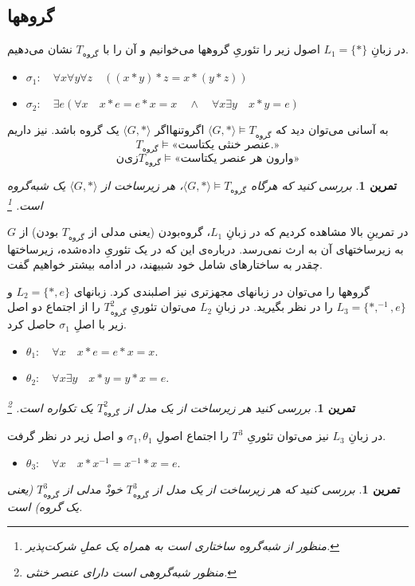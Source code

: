 \documentclass[12pt,a4paper]{report}
\theoremstyle{colorhead}
\newtheorem{tam}[thm]{تمرین}
\begin{document}
\subsection{گروهها }
در زبانِ
$L_1=\{*\}$
اصول زیر را تئوری‌ِ‌ گروهها می‌خوانیم و آن را با
$T_{\text{گروه}}$
نشان می‌دهیم.
\begin{itemize}
\item 
$\sigma_1: \quad \forall x\forall y\forall z \quad \left((x*y)*z=x*(y*z)\right)$
\item $\sigma_2: \quad \exists e \left( \forall x\quad  x*e=e*x=x\quad \wedge\quad  \forall x
 \exists y \quad x*y=e\right)$
\end{itemize}
به آسانی می‌توان دید که
$\langle G,*\rangle \models T_{\text{گروه}}$
اگروتنهااگر
$\langle G,*\rangle$
یک گروه باشد. نیز داریم
\[
T_{\text{گروه}}\models \text{«عنصر خنثی یکتاست.»}
\]
\[
نیز
T_{\text{گروه}}\models \text{«وارون هر عنصر یکتاست»}
\]
\begin{tam}
بررسی کنید که هرگاه
$\langle G,*\rangle \models T_{\text{گروه}}$،
هر زیرساخت از
$\langle G,*\rangle$
یک شبه‌گروه
است.
\footnote{منظور از شبه‌گروه ساختاری است به همراه یک عملِ شرکت‌پذیر.}
\end{tam}
در تمرینِ بالا مشاهده کردیم که در زبانِ
$L_1$،
گروه‌بودن (یعنی مدلی از
$T_{\text{گروه}}$
بودن)
از
$G$
به زیرساختهای آن به ارث نمی‌رسد. درباره‌ی این که در یک تئوریِ داده‌شده،‌ 
زیرساختها چقدر به ساختارهای شامل خود شبیهند، در ادامه بیشتر خواهیم گفت.
\par 
گروهها را می‌توان در زبانهای مجهزتری نیز اصلبندی کرد. زبانهای
$L_2=\{*,e\}$
و
\mbox{$L_3=\{*,^{-1},e\}$}
را در نظر بگیرید. در زبانِ
$L_2$
می‌توان تئوریِ
$T^2_{\text{گروه}}$
را از اجتماع دو اصل زیر با اصلِ
$\sigma_1$
حاصل کرد.
\begin{itemize}
\item 
$\theta_1:\quad \forall x \quad x*e=e*x=x$.
\item 
$\theta_2:\quad \forall x\exists y\quad x*y=y*x=e$.
\end{itemize}
\begin{tam}
بررسی کنید هر زیرساخت از یک مدل از
$T^2_{\text{گروه}}$
یک تکواره
است.
\footnote{منظور شبه‌گروهی است دارای عنصر خنثی.}
\end{tam}
در زبانِ
$L_3$
نیز می‌توان تئوریِ
$T^3_{\text{}}$
را اجتماع اصولِ
$\sigma_1,\theta_1$
و
اصل زیر در نظر گرفت.
\begin{itemize}
\item $\theta_3:\quad \forall x\quad x*x^{-1}=x^{-1}*x=e$.
\end{itemize}
\begin{tam}
بررسی کنید که هر زیرساخت از یک مدل از 
$T^3_{\text{گروه}}$
خودْ مدلی از
$T^3_{\text{گروه}}$
(یعنی یک گروه) است.
\end{tam}
\end{document}

